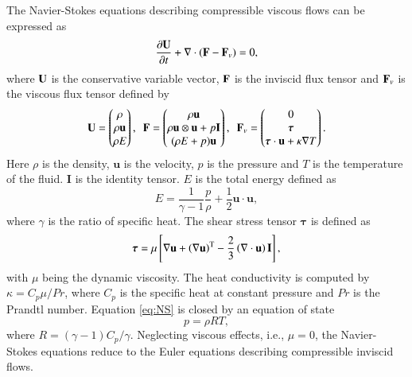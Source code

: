 The Navier-Stokes equations describing compressible viscous flows can be expressed as
\begin{equation}
    \label{eq:NS}
    \dfrac{\partial \mathbf{U}}{\partial t} +
    \nabla \cdot (\mathbf{F} - \mathbf{F}_v)= 0,
\end{equation}
where $\mathbf{U}$ is the conservative variable vector, $\mathbf{F}$ is the inviscid flux tensor and $\mathbf{F}_v$
is the viscous flux tensor defined by
\begin{equation}
    \mathbf{U} = \begin{pmatrix}
        \rho \\ \rho \mathbf{u} \\ \rho E
    \end{pmatrix},\ \
    \mathbf{F}= \begin{pmatrix}
        \rho \mathbf{u}                                \\
        \rho \mathbf{u}\otimes \mathbf{u}+p \mathbf{I} \\
        (\rho E+p)\mathbf{u}                           \\
    \end{pmatrix},\ \
    \mathbf{F}_{v} = \begin{pmatrix}
        0                                                    \\
        \boldsymbol{\tau}                                    \\
        \boldsymbol{\tau} \cdot \mathbf{u} + \kappa \nabla T \\
    \end{pmatrix}.
\end{equation}
Here $\rho$ is the density, $\mathbf{u}$ is the velocity, $p$ is the pressure and $T$ is the temperature of the fluid. $\mathbf{I}$ is the identity tensor. $E$ is the total energy defined as
\begin{equation}
    E = \dfrac{1}{\gamma-1} \dfrac{p}{\rho} + \frac{1}{2} \mathbf{u} \cdot \mathbf{u},
\end{equation}
where $\gamma$ is the ratio of specific heat. The shear stress tensor $\boldsymbol{\tau}$ is defined as
\begin{equation}
    \boldsymbol{\tau}= \mu \left[ \nabla \mathbf{u} + \left(\nabla \mathbf{u}\right)^\mathrm{T} - \frac{2}{3} \left(\nabla \cdot \mathbf{u}\right) \mathbf{I} \right],
\end{equation}
with $\mu$ being the dynamic viscosity. The heat conductivity is computed by $\kappa=C_p \mu /Pr$, where $C_p$ is the specific heat at constant pressure and $Pr$ is the Prandtl number. Equation \eqref{eq:NS} is closed by an equation of state
\begin{equation}
    p= \rho R T,
\end{equation}
where $R= \left(\gamma-1\right) C_p/\gamma$.
Neglecting viscous effects, i.e., $\mu=0$, the Navier-Stokes equations reduce to the Euler equations describing compressible inviscid flows.

